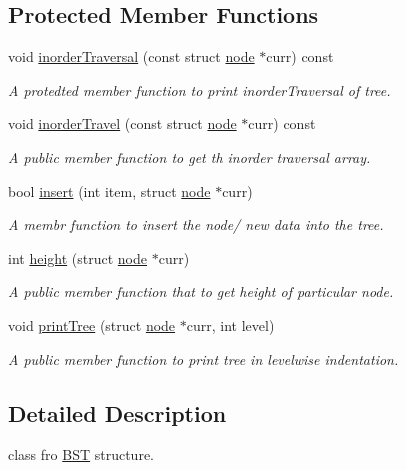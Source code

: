 \subsection*{Protected Member Functions}
\begin{DoxyCompactItemize}
\item 
void \hyperlink{classBST_a3ed595e801648f5c145f145c371489b4}{inorder\+Traversal} (const struct \hyperlink{structnode}{node} $\ast$curr) const
\begin{DoxyCompactList}\small\item\em A protedted member function to print inorder\+Traversal of tree. \end{DoxyCompactList}\item 
void \hyperlink{classBST_ab26627cb83fe02abc1940e61b5b32048}{inorder\+Travel} (const struct \hyperlink{structnode}{node} $\ast$curr) const
\begin{DoxyCompactList}\small\item\em A public member function to get th inorder traversal array. \end{DoxyCompactList}\item 
bool \hyperlink{classBST_ac6e2b74e41a615fa4ccc1b7de4981559}{insert} (int item, struct \hyperlink{structnode}{node} $\ast$curr)
\begin{DoxyCompactList}\small\item\em A membr function to insert the node/ new data into the tree. \end{DoxyCompactList}\item 
int \hyperlink{classBST_a78398f0b59f1459c979fd364bdba5844}{height} (struct \hyperlink{structnode}{node} $\ast$curr)
\begin{DoxyCompactList}\small\item\em A public member function that to get height of particular node. \end{DoxyCompactList}\item 
\mbox{\label{classBST_ae7baf9b6e337102a9b611a2b21225bd5}} 
void \hyperlink{classBST_ae7baf9b6e337102a9b611a2b21225bd5}{print\+Tree} (struct \hyperlink{structnode}{node} $\ast$curr, int level)
\begin{DoxyCompactList}\small\item\em A public member function to print tree in levelwise indentation. \end{DoxyCompactList}\end{DoxyCompactItemize}


\subsection{Detailed Description}
class fro \hyperlink{classBST}{B\+ST} structure. 

